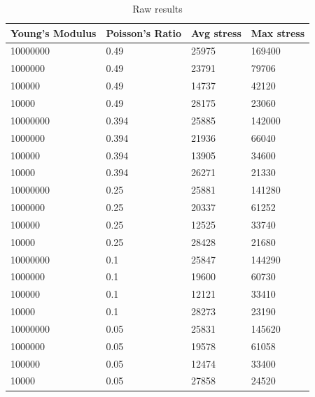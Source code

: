 \documentclass[conference]{IEEEtran}
\begin{document}
\begin{table}[!t]
    \centering
    \caption{Raw results}
    \label{resultsRaw}
    \begin{tabular}{llll}
    \hline
     Young's Modulus  & Poisson's Ratio & Avg stress & Max stress \\ \hline \hline
    10000000          & 0.49            & 25975        & 169400       \\ \hline 
    1000000           & 0.49            & 23791        & 79706        \\ \hline
    100000            & 0.49            & 14737        & 42120        \\ \hline
    10000             & 0.49            & 28175        & 23060        \\ \hline
    10000000          & 0.394           & 25885        & 142000       \\ \hline
    1000000           & 0.394           & 21936        & 66040        \\ \hline
    100000            & 0.394           & 13905        & 34600        \\ \hline
    10000             & 0.394           & 26271        & 21330        \\ \hline
    10000000          & 0.25            & 25881        & 141280       \\ \hline
    1000000           & 0.25            & 20337        & 61252        \\ \hline
    100000            & 0.25            & 12525        & 33740        \\ \hline
    10000             & 0.25            & 28428        & 21680        \\ \hline
    10000000          & 0.1             & 25847        & 144290       \\ \hline
    1000000           & 0.1             & 19600        & 60730        \\ \hline
    100000            & 0.1             & 12121        & 33410        \\ \hline
    10000             & 0.1             & 28273        & 23190        \\ \hline
    10000000          & 0.05            & 25831        & 145620       \\ \hline
    1000000           & 0.05            & 19578        & 61058        \\ \hline
    100000            & 0.05            & 12474        & 33400        \\ \hline
    10000             & 0.05            & 27858        & 24520        \\ \hline
    \end{tabular}
\end{table}
\end{document}
